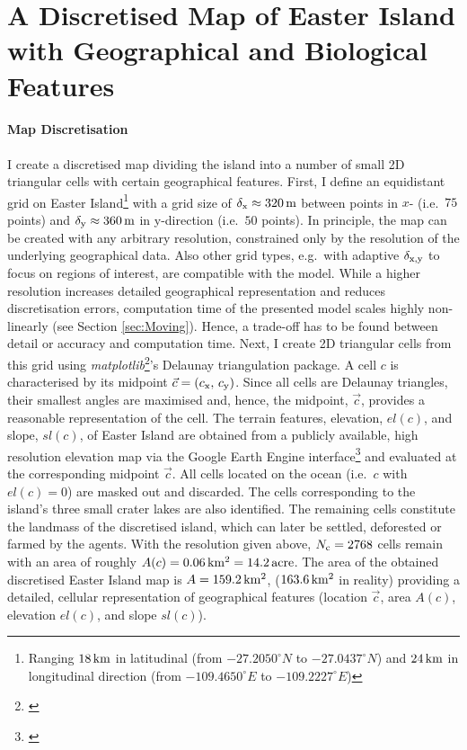 \FloatBarrier
\section{A Discretised Map of Easter Island with Geographical and Biological Features}\label{sec:CreateMap}
\paragraph{Map Discretisation}
I create a discretised map dividing the island into a number of small 2D triangular cells with certain geographical features.
First, I define an equidistant grid on Easter Island\footnote{Ranging $18\, {\rm km}$ in latitudinal (from $-27.2050^\circ N$ to $-27.0437^\circ N$) and $24\, {\rm km}$ in longitudinal direction (from  $-109.4650^\circ E$ to 
 $-109.2227^\circ E$)} with a grid size of $\delta_{\rm x} \approx 320\, {\rm m}$ between points in $x$- (i.e.\ $75$ points) and $\delta_{\rm y} \approx 360\, {\rm m}$ in y-direction (i.e.\ $50$ points). 
In principle, the map can be created with any arbitrary resolution, constrained only by the resolution of the underlying geographical data. 
Also other grid types, e.g.\ with adaptive $\delta_{\rm x,y}$ to focus on regions of interest, are compatible with the model. 
While a higher resolution increases detailed geographical representation and reduces discretisation errors, computation time of the presented model scales highly non-linearly (see Section \ref{sec:Moving}).
Hence, a trade-off has to be found between detail or accuracy and computation time.
Next, I create 2D triangular cells from this grid using \textit{matplotlib}\footnote{\citet{matplotlib}}'s Delaunay triangulation package.
A cell $c$ is characterised by its midpoint $\vec{c} = (c_{\rm x},\, c_{\rm y})$. 
Since all cells are Delaunay triangles, their smallest angles are maximised and, hence, the midpoint, $\vec{c}$, provides a reasonable representation of the cell.
The terrain features, elevation, $el(c)$, and slope, $sl(c)$, of Easter Island are obtained from a publicly available, high resolution elevation map \citep{Jarvis2008CIGAR} via the Google Earth Engine interface\footnote{\citet{gorelick2017google}} and evaluated at the corresponding midpoint $\vec{c}$.
All cells located on the ocean (i.e.\ $c$ with $el(c)=0$) are masked out and discarded.
The cells corresponding to the island's three small crater lakes are also identified.
The remaining cells constitute the landmass of the discretised island, which can later be settled, deforested or farmed by the agents. 
With the resolution given above, $N_{\rm c} = 2768$ cells remain with an area of roughly $A(c)= 0.06 \, {\rm km^2} = 14.2 \, {\rm acre}$.
The area of the obtained discretised Easter Island map is $A=159.2\, {\rm km^2}$, ($163.6\, {\rm km^2}$ in reality) providing a detailed, cellular representation of geographical features (location $\vec{c}$, area $A(c)$, elevation $el(c)$, and slope $sl(c)$).

